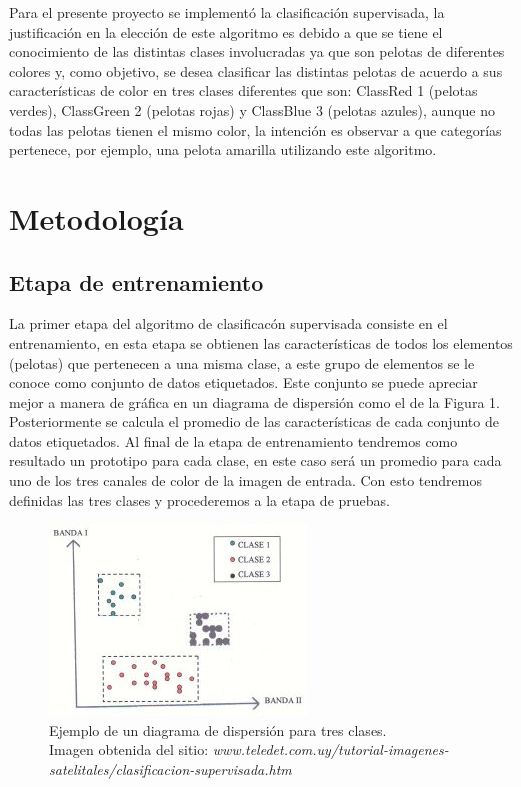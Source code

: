 \documentclass[conference]{IEEEtran}
\begin{document}
Para el presente proyecto se implement\'o la clasificaci\'on supervisada, la justificaci\'on en la elecci\'on de este algoritmo es debido a que se tiene el conocimiento de las distintas clases involucradas ya que son pelotas de diferentes colores y, como objetivo, se desea clasificar las distintas pelotas de acuerdo a sus caracter\'isticas de color en tres clases diferentes que son: ClassRed 1 (pelotas verdes), ClassGreen 2 (pelotas rojas) y ClassBlue 3 (pelotas azules), aunque no todas las pelotas tienen el mismo color, la intenci\'on es observar a que categor\'ias pertenece, por ejemplo, una pelota amarilla utilizando este algoritmo.\\

\section{Metodolog\'ia}
\subsection{Etapa de entrenamiento}
La primer etapa del algoritmo de clasificac\'on supervisada consiste en el entrenamiento, en esta etapa se obtienen las caracter\'isticas de todos los elementos (pelotas) que pertenecen a una misma clase, a este grupo de elementos se le conoce como conjunto de datos etiquetados. Este conjunto se puede apreciar mejor a manera de gr\'afica en un diagrama de dispersi\'on como el de la Figura 1. \\

Posteriormente se calcula el promedio de las caracter\'isticas de cada conjunto de datos etiquetados. Al final de la etapa de entrenamiento tendremos como resultado un prototipo para cada clase, en este caso ser\'a un promedio para cada uno de los tres canales de color de la imagen de entrada. Con esto tendremos definidas las tres clases y procederemos a la etapa de pruebas. \\

\begin{figure}[h]
	\setlength{\unitlength}{0.00105in}
	\centering
	\includegraphics[scale=0.85]{./images/clasificacion_supervisada1.jpg}
	\caption{ Ejemplo de un diagrama de dispersi\'on para tres clases.\\ Imagen obtenida del sitio: \emph{ www.teledet.com.uy/tutorial-imagenes-satelitales/clasificacion-supervisada.htm} }
\end{figure}
\end{document}
